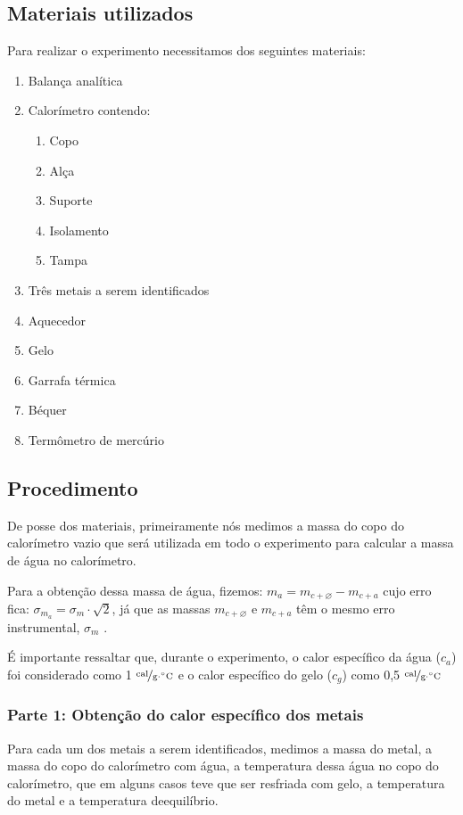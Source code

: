 \documentclass[a4paper]{article}
\begin{document}
		\subsection{Materiais utilizados}
			Para realizar o experimento necessitamos dos seguintes materiais:
			
			\begin{enumerate}
				\item Balança analítica 
				\item Calorímetro contendo:
					\begin{enumerate}
						\item Copo 
						\item Alça 
						\item Suporte 
						\item Isolamento 
						\item Tampa
					\end{enumerate}
				\item Três metais a serem identificados 
				\item Aquecedor 
				\item Gelo 
				\item Garrafa térmica 
				\item Béquer 
				\item Termômetro de mercúrio 
			\end{enumerate}
			
		\subsection{Procedimento}

			De posse dos materiais, primeiramente nós medimos a massa do copo do calorímetro vazio que será utilizada em todo o experimento para calcular a massa de água no calorímetro.			
			
			Para a obtenção dessa massa de água, fizemos: $m_{a}=m_{c+\varnothing}-m_{c+a}$	cujo erro fica: $\sigma_{m_{a}}=\sigma_{m}\cdot\sqrt{2}$, já que as massas $m_{c+\varnothing}$ e $m_{c+a}$ têm o mesmo erro instrumental, $\sigma_{m}$ .
			
			É importante ressaltar que, durante o experimento, o calor específico da água ($c_a$) foi considerado como 1 $\unitfrac{cal}{g \cdot ^{\circ}C}$ e o calor específico do gelo ($c_g$) como 0,5 $\unitfrac{cal}{g \cdot ^{\circ}C}$

			\subsubsection{Parte 1: Obtenção do calor específico dos metais}
				Para cada um dos metais a serem identificados, medimos a massa do metal, a massa do copo do calorímetro com água, a temperatura dessa água no copo do calorímetro, que em alguns casos teve que ser resfriada com gelo, a temperatura do metal e a temperatura deequilíbrio.
				
\end{document}
